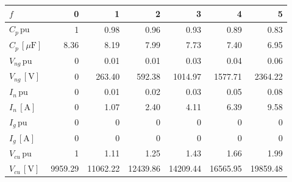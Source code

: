 \begin{tabular}{lrrrrrr}
\toprule
$f$ & 0 & 1 & 2 & 3 & 4 & 5 \\
\midrule
$C_p \, \mathrm{pu}$ & 1 & 0.98 & 0.96 & 0.93 & 0.89 & 0.83 \\
$C_p \, [\mu\mathrm{F}]$ & 8.36 & 8.19 & 7.99 & 7.73 & 7.40 & 6.95 \\
$V_{ng} \, \mathrm{pu}$ & 0 & 0.01 & 0.01 & 0.03 & 0.04 & 0.06 \\
$V_{ng} \, [\mathrm{V}]$ & 0 & 263.40 & 592.38 & 1014.97 & 1577.71 & 2364.22 \\
$I_{n} \, \mathrm{pu}$ & 0 & 0.01 & 0.02 & 0.03 & 0.05 & 0.08 \\
$I_{n} \, [\mathrm{A}]$ & 0 & 1.07 & 2.40 & 4.11 & 6.39 & 9.58 \\
$I_{g} \, \mathrm{pu}$ & 0 & 0 & 0 & 0 & 0 & 0 \\
$I_{g} \, [\mathrm{A}]$ & 0 & 0 & 0 & 0 & 0 & 0 \\
$V_{cu} \, \mathrm{pu}$ & 1 & 1.11 & 1.25 & 1.43 & 1.66 & 1.99 \\
$V_{cu} \, [\mathrm{V}]$ & 9959.29 & 11062.22 & 12439.86 & 14209.44 & 16565.95 & 19859.48 \\
\bottomrule
\end{tabular}